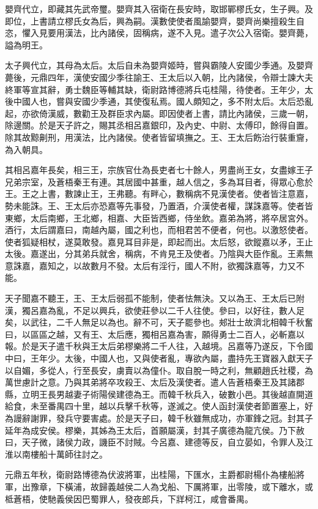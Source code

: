 嬰齊代立，即藏其先武帝璽。嬰齊其入宿衛在長安時，取邯鄲樛氏女，生子興。及即位，上書請立樛氏女為后，興為嗣。漢數使使者風諭嬰齊，嬰齊尚樂擅殺生自恣，懼入見要用漢法，比內諸侯，固稱病，遂不入見。遣子次公入宿衛。嬰齊薨，謚為明王。

太子興代立，其母為太后。太后自未為嬰齊姬時，嘗與霸陵人安國少季通。及嬰齊薨後，元鼎四年，漢使安國少季往諭王、王太后以入朝，比內諸侯，令辯士諫大夫終軍等宣其辭，勇士魏臣等輔其缺，衛尉路博德將兵屯桂陽，待使者。王年少，太後中國人也，嘗與安國少季通，其使復私焉。國人頗知之，多不附太后。太后恐亂起，亦欲倚漢威，數勸王及群臣求內屬。即因使者上書，請比內諸侯，三歲一朝，除邊關。於是天子許之，賜其丞相呂嘉銀印，及內史、中尉、太傅印，餘得自置。除其故黥劓刑，用漢法，比內諸侯。使者皆留填撫之。王、王太后飭治行裝重齎，為入朝具。

其相呂嘉年長矣，相三王，宗族官仕為長吏者七十餘人，男盡尚王女，女盡嫁王子兄弟宗室，及蒼梧秦王有連。其居國中甚重，越人信之，多為耳目者，得眾心愈於王。王之上書，數諫止王，王弗聽。有畔心，數稱病不見漢使者。使者皆注意嘉，勢未能誅。王、王太后亦恐嘉等先事發，乃置酒，介漢使者權，謀誅嘉等。使者皆東鄉，太后南鄉，王北鄉，相嘉、大臣皆西鄉，侍坐飲。嘉弟為將，將卒居宮外。酒行，太后謂嘉曰，南越內屬，國之利也，而相君苦不便者，何也。以激怒使者。使者狐疑相杖，遂莫敢發。嘉見耳目非是，即起而出。太后怒，欲鏦嘉以矛，王止太後。嘉遂出，分其弟兵就舍，稱病，不肯見王及使者。乃陰與大臣作亂。王素無意誅嘉，嘉知之，以故數月不發。太后有淫行，國人不附，欲獨誅嘉等，力又不能。

天子聞嘉不聽王，王、王太后弱孤不能制，使者怯無決。又以為王、王太后已附漢，獨呂嘉為亂，不足以興兵，欲使莊參以二千人往使。參曰，以好往，數人足矣，以武往，二千人無足以為也。辭不可，天子罷參也。郟壯士故濟北相韓千秋奮曰，以區區之越，又有王、太后應，獨相呂嘉為害，願得勇士二百人，必斬嘉以報。於是天子遣千秋與王太后弟樛樂將二千人往，入越境。呂嘉等乃遂反，下令國中曰，王年少。太後，中國人也，又與使者亂，專欲內屬，盡持先王寶器入獻天子以自媚，多從人，行至長安，虜賣以為僮仆。取自脫一時之利，無顧趙氏社稷，為萬世慮計之意。乃與其弟將卒攻殺王、太后及漢使者。遣人告蒼梧秦王及其諸郡縣，立明王長男越妻子術陽侯建德為王。而韓千秋兵入，破數小邑。其後越直開道給食，未至番禺四十里，越以兵擊千秋等，遂滅之。使人函封漢使者節置塞上，好為謾辭謝罪，發兵守要害處。於是天子曰，韓千秋雖無成功，亦軍鋒之冠。封其子延年為成安侯。樛樂，其姊為王太后，首願屬漢，封其子廣德為龍亢侯。乃下赦曰，天子微，諸侯力政，譏臣不討賊。今呂嘉、建德等反，自立晏如，令罪人及江淮以南樓船十萬師往討之。

元鼎五年秋，衛尉路博德為伏波將軍，出桂陽，下匯水，主爵都尉楊仆為樓船將軍，出豫章，下橫浦，故歸義越侯二人為戈船、下厲將軍，出零陵，或下離水，或柢蒼梧，使馳義侯因巴蜀罪人，發夜郎兵，下牂柯江，咸會番禺。

